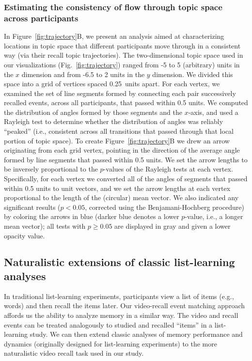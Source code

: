 \documentclass{article}
\begin{document}
\subsubsection*{Estimating the consistency of flow through topic space across participants}
In Figure~\ref{fig:trajectory}B, we present an analysis aimed at characterizing locations in topic space that different participants move through in a consistent way (via their recall topic trajectories).  The two-dimensional topic space used in our visualizations (Fig.~\ref{fig:trajectory}) ranged from -5 to 5 (arbitrary) units in the $x$ dimension and from -6.5 to 2 units in the $y$ dimension.  We divided this space into a grid of vertices spaced 0.25~units apart.  For each vertex, we examined the set of line segments formed by connecting each pair successively recalled events, across all participants, that passed within 0.5 units.  We computed the distribution of angles formed by those segments and the $x$-axis, and used a Rayleigh test to determine whether the distribution of angles was reliably ``peaked'' (i.e., consistent across all transitions that passed through that local portion of topic space).  To create Figure~\ref{fig:trajectory}B we drew an arrow originating from each grid vertex, pointing in the direction of the average angle formed by line segments that passed within 0.5 units.  We set the arrow lengths to be inversely proportional to the $p$-values of the Rayleigh tests at each vertex.  Specifically, for each vertex we converted all of the angles of segments that passed within 0.5 units to unit vectors, and we set the arrow lengths at each vertex proportional to the length of the (circular) mean vector.  We also indicated any significant results ($p < 0.05$, corrected using the Benjamani-Hochberg procedure) by coloring the arrows in blue (darker blue denotes a lower $p$-value, i.e., a longer mean vector); all tests with $p \geq 0.05$ are displayed in gray and given a lower opacity value.

\subsection*{Naturalistic extensions of classic list-learning analyses}
In traditional list-learning experiments, participants view a list of items (e.g., words) and then recall the items later.  Our video-recall event matching approach affords us the ability to analyze memory in a similar way. The video and recall events can be treated analogously to studied and recalled ``items'' in a list-learning study.  We can then extend classic analyses of memory performance and dynamics (originally designed for list-learning experiments) to the more naturalistic video recall task used in our study.
\end{document}
